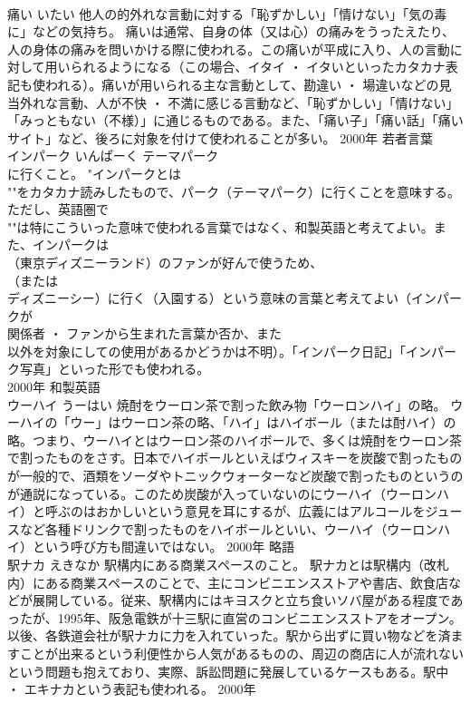 \documentclass[8pt]{extreport}
\begin{document}
\begin{CJK}{UTF8}{min}
\\	痛い	いたい	他人の的外れな言動に対する「恥ずかしい」「情けない」「気の毒に」などの気持ち。	痛いは通常、自身の体（又は心）の痛みをうったえたり、人の身体の痛みを問いかける際に使われる。この痛いが平成に入り、人の言動に対して用いられるようになる（この場合、イタイ ・ イタいといったカタカナ表記も使われる）。痛いが用いられる主な言動として、勘違い ・ 場違いなどの見当外れな言動、人が不快 ・ 不満に感じる言動など、「恥ずかしい」「情けない」「みっともない（不様）」に通じるものである。また、「痛い子」「痛い話」「痛いサイト」など、後ろに対象を付けて使われることが多い。	2000年	若者言葉	
\\	インパーク	いんぱーく	テーマパーク
\\	に行くこと。	"インパークとは
\\	""をカタカナ読みしたもので、パーク（テーマパーク）に行くことを意味する。ただし、英語圏で
\\	""は特にこういった意味で使われる言葉ではなく、和製英語と考えてよい。また、インパークは
\\	（東京ディズニーランド）のファンが好んで使うため、
\\	（または
\\	ディズニーシー）に行く（入園する）という意味の言葉と考えてよい（インパークが
\\	関係者 ・ ファンから生まれた言葉か否か、また
\\	以外を対象にしての使用があるかどうかは不明）。「インパーク日記」「インパーク写真」といった形でも使われる。
\\	2000年	和製英語	
\\	ウーハイ	うーはい	焼酎をウーロン茶で割った飲み物「ウーロンハイ」の略。	ウーハイの「ウー」はウーロン茶の略、「ハイ」はハイボール（または酎ハイ）の略。つまり、ウーハイとはウーロン茶のハイボールで、多くは焼酎をウーロン茶で割ったものをさす。日本でハイボールといえばウィスキーを炭酸で割ったものが一般的で、酒類をソーダやトニックウォーターなど炭酸で割ったものというのが通説になっている。このため炭酸が入っていないのにウーハイ（ウーロンハイ）と呼ぶのはおかしいという意見を耳にするが、広義にはアルコールをジュースなど各種ドリンクで割ったものをハイボールといい、ウーハイ（ウーロンハイ）という呼び方も間違いではない。	2000年	略語	
\\	駅ナカ	えきなか	駅構内にある商業スペースのこと。	駅ナカとは駅構内（改札内）にある商業スペースのことで、主にコンビニエンスストアや書店、飲食店などが展開している。従来、駅構内にはキヨスクと立ち食いソバ屋がある程度であったが、1995年、阪急電鉄が十三駅に直営のコンビニエンスストアをオープン。以後、各鉄道会社が駅ナカに力を入れていった。駅から出ずに買い物などを済ますことが出来るという利便性から人気があるものの、周辺の商店に人が流れないという問題も抱えており、実際、訴訟問題に発展しているケースもある。駅中 ・ エキナカという表記も使われる。	2000年	

\end{CJK}
\end{document}

